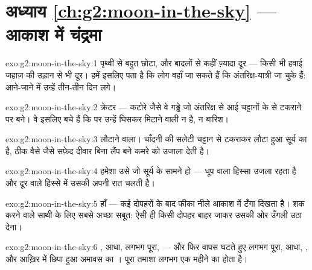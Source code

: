 \section*{अध्याय \ref{ch:g2:moon-in-the-sky} --- आकाश में चंद्रमा}

\begin{solution}{exo:g2:moon-in-the-sky:1}
पृथ्वी से बहुत छोटा, और बादलों से कहीं ज़्यादा दूर --- किसी भी हवाई
जहाज़ की उड़ान से भी दूर। हमें इसलिए पता है कि लोग वहाँ जा सकते हैं
कि अंतरिक्ष-यात्री जा चुके हैं: आने-जाने में उन्हें तीन-तीन दिन लगे।
\end{solution}

\begin{solution}{exo:g2:moon-in-the-sky:2}
क्रेटर --- कटोरे जैसे वे गड्ढे जो अंतरिक्ष से आई चट्टानों के 
से टकराने पर बने। वे इसलिए बचे हैं कि  पर उन्हें घिसकर मिटाने
वाली न  है, न बारिश।
\end{solution}

\begin{solution}{exo:g2:moon-in-the-sky:3}
 लौटाने वाला। चाँदनी  की सलेटी चट्टान से टकराकर लौटा
हुआ सूर्य का  है, ठीक वैसे जैसे सफ़ेद दीवार बिना लैंप बने कमरे
को उजाला देती है।
\end{solution}

\begin{solution}{exo:g2:moon-in-the-sky:4}
हमेशा उसे जो सूर्य के सामने हो --- धूप वाला हिस्सा उजला रहता है और
दूर वाले हिस्से में उसकी अपनी रात चलती है।
\end{solution}

\begin{solution}{exo:g2:moon-in-the-sky:5}
हाँ --- कई दोपहरों के बाद फीका  नीले आकाश में टँगा दिखता है।
शक करने वाले साथी के लिए सबसे अच्छा सबूत: ऐसी ही किसी दोपहर बाहर
जाकर उसकी ओर उँगली उठा देना।
\end{solution}

\begin{solution}{exo:g2:moon-in-the-sky:6}
, आधा, लगभग पूरा,  --- और फिर वापस घटते हुए लगभग
पूरा, आधा, , और आख़िर में छिपा हुआ अमावस का । पूरा
तमाशा लगभग एक महीने का होता है।
\end{solution}

